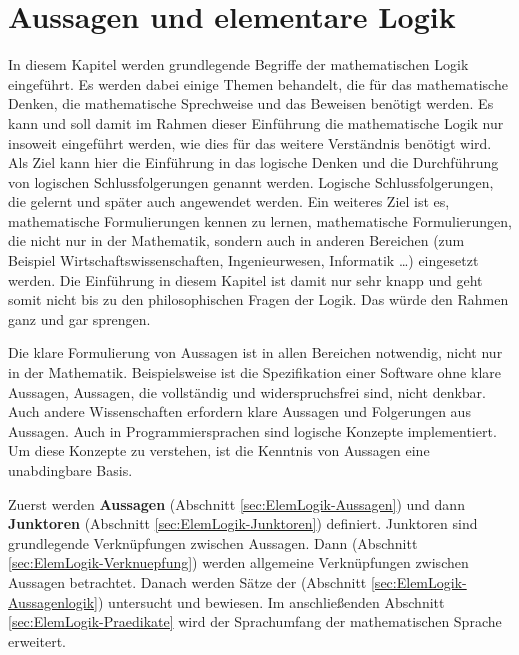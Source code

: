 
\chapter{Aussagen und elementare Logik}
\label{cha:Gdl-K02-ElemLogik}

In diesem Kapitel werden grundlegende Begriffe der mathematischen Logik 
eingeführt. Es werden dabei einige Themen behandelt, die für das 
mathematische Denken, die mathematische Sprechweise und das Beweisen 
benötigt werden. Es kann und soll damit im Rahmen dieser Einführung die
mathematische Logik nur insoweit eingeführt werden, wie dies für das 
weitere Verständnis benötigt wird. Als Ziel kann hier die Einführung in das 
logische Denken und die Durchführung von logischen Schlussfolgerungen genannt
werden. Logische Schlussfolgerungen, die gelernt und später auch angewendet 
werden. Ein weiteres Ziel ist es, mathematische Formulierungen kennen zu 
lernen, mathematische Formulierungen, die nicht nur in der Mathematik, 
sondern auch in anderen Bereichen (zum Beispiel Wirtschaftswissenschaften,
Ingenieurwesen, Informatik \ldots) eingesetzt werden. Die Einführung in 
diesem Kapitel ist damit nur sehr knapp und geht somit nicht bis zu den
philosophischen Fragen der Logik. Das würde den Rahmen ganz und gar 
sprengen.

Die klare Formulierung von Aussagen ist in allen Bereichen notwendig, nicht 
nur in der Mathematik. Beispielsweise ist die Spezifikation einer Software 
ohne klare Aussagen, Aussagen, die vollständig und widerspruchsfrei sind, 
nicht denkbar. Auch andere Wissenschaften erfordern klare Aussagen und 
Folgerungen aus Aussagen. Auch in Programmiersprachen sind logische Konzepte
implementiert. Um diese Konzepte zu verstehen, ist die Kenntnis von Aussagen 
eine unabdingbare Basis.

Zuerst werden \textbf{Aussagen} (Abschnitt \ref{sec:ElemLogik-Aussagen}) und 
dann \textbf{Junktoren} (Abschnitt \ref{sec:ElemLogik-Junktoren}) definiert.
Junktoren sind grundlegende Verknüpfungen zwischen Aussagen. Dann (Abschnitt
\ref{sec:ElemLogik-Verknuepfung}) werden allgemeine Verknüpfungen zwischen 
Aussagen betrachtet. Danach werden Sätze der  
(Abschnitt \ref{sec:ElemLogik-Aussagenlogik}) untersucht und bewiesen. 
Im anschließenden Abschnitt \ref{sec:ElemLogik-Praedikate} wird der 
Sprachumfang der mathematischen Sprache erweitert. 

